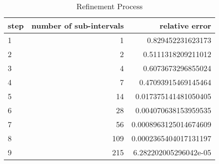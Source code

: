 \documentclass{article}
\begin{document}
\begin{table}[H]
    \centering
    \begin{tabular}{l|r|r}
        step & number of sub-intervals & relative error \\
        \hline
        1  &   1 & 0.829452231623173 \\
        2  &   2 & 0.5111318209211012 \\
        3  &   4 & 0.6073673296855024 \\
        4  &   7 & 0.47093915469145464 \\
        5  &  14 & 0.017375141481050405 \\
        6  &  28 & 0.004070638153959535 \\
        7  &  56 & 0.0008963125014674609 \\
        8  & 109 & 0.0002365404017131197 \\
        9  & 215 & 6.282202005296042e-05 \\
    \end{tabular}
    \caption{Refinement Process}
\end{table}
\end{document}
